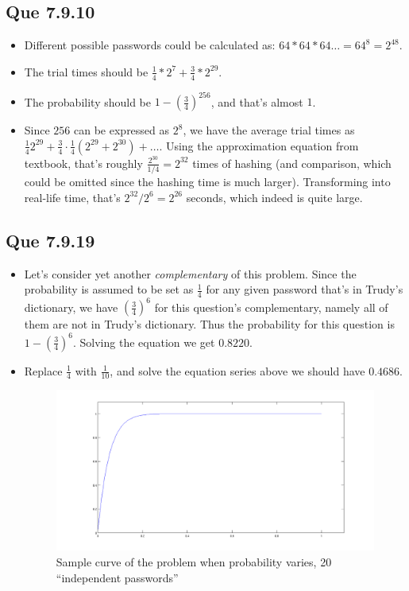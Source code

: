 \documentclass{article}
\begin{document}
\subsection{Que 7.9.10}
\label{sec:que-7.9.10}

\begin{itemize}
\item Different possible passwords could be calculated as: $64\ast
  64\ast 64\ldots=64^{8}=2^{48}$.
\item The trial times should be $\frac{1}{4}\ast 2^{7}+\frac{3}{4}\ast
  2^{29}$.
\item The probability should be $1-{(\frac{3}{4})}^{256}$, and that's
  almost $1$.
\item Since $256$ can be expressed as $2^{8}$, we have the average
  trial times as
  $\frac{1}{4}2^{29}+\frac{3}{4}\cdot\frac{1}{4}(2^{29}+2^{30})+\ldots$. Using
  the approximation equation from textbook, that's roughly
  $\frac{2^{30}}{1/4}=2^{32}$ times of hashing (and comparison, which
  could be omitted since the hashing time is much
  larger). Transforming into real-life time, that's
  $2^{32}/2^{6}=2^{26}$ seconds, which indeed is quite large.
\end{itemize}

\subsection{Que 7.9.19}
\label{sec:que-7.9.19}

\begin{itemize}
\item Let's consider yet another \emph{complementary} of this
  problem. Since the probability is assumed to be set as $\frac{1}{4}$
  for any given password that's in Trudy's dictionary, we have
  ${(\frac{3}{4})}^{6}$ for this question's complementary, namely all
  of them are not in Trudy's dictionary. Thus the probability for this
  question is $1-{(\frac{3}{4})}^{6}$. Solving the equation we get
  $0.8220$.
\item Replace $\frac{1}{4}$ with $\frac{1}{10}$, and solve the
  equation series above we should have $0.4686$.
  \begin{figure}[htbp]
    \centering
    \includegraphics[scale=0.25]{Toy-Birthday}
    \caption{Sample curve of the problem when probability varies, 20 ``independent passwords''}
\label{fig:toy-birthday-attack}
  \end{figure}
\end{itemize}
\end{document}
